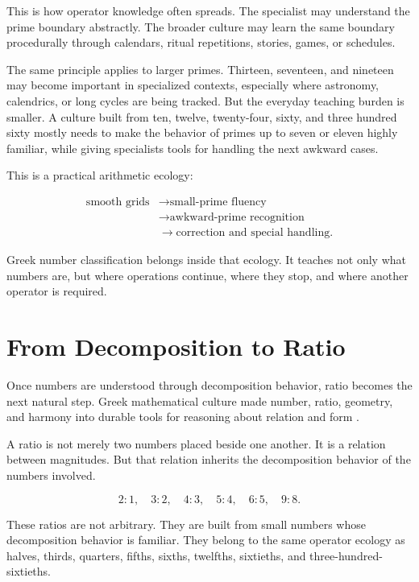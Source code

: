 \documentclass[11pt]{book}
\begin{document}
This is how operator knowledge often spreads. The specialist may understand the prime boundary abstractly. The broader culture may learn the same boundary procedurally through calendars, ritual repetitions, stories, games, or schedules.

The same principle applies to larger primes. Thirteen, seventeen, and nineteen may become important in specialized contexts, especially where astronomy, calendrics, or long cycles are being tracked. But the everyday teaching burden is smaller. A culture built from ten, twelve, twenty-four, sixty, and three hundred sixty mostly needs to make the behavior of primes up to seven or eleven highly familiar, while giving specialists tools for handling the next awkward cases.

This is a practical arithmetic ecology:

\[
\begin{aligned}
\text{smooth grids}
&\rightarrow
\text{small-prime fluency} \\
&\rightarrow
\text{awkward-prime recognition} \\
&\rightarrow
\text{correction and special handling}.
\end{aligned}
\]

Greek number classification belongs inside that ecology. It teaches not only what numbers are, but where operations continue, where they stop, and where another operator is required.

\section{From Decomposition to Ratio}

Once numbers are understood through decomposition behavior, ratio becomes the next natural step. Greek mathematical culture made number, ratio, geometry, and harmony into durable tools for reasoning about relation and form \cite{Heath1921GreekMathematics,Netz1999ShapingDeduction,Barker1989GreekMusicalWritings}.
 
A ratio is not merely two numbers placed beside one another. It is a relation between magnitudes. But that relation inherits the decomposition behavior of the numbers involved.

\[
2:1,
\quad
3:2,
\quad
4:3,
\quad
5:4,
\quad
6:5,
\quad
9:8.
\]

These ratios are not arbitrary. They are built from small numbers whose decomposition behavior is familiar. They belong to the same operator ecology as halves, thirds, quarters, fifths, sixths, twelfths, sixtieths, and three-hundred-sixtieths.
\end{document}
